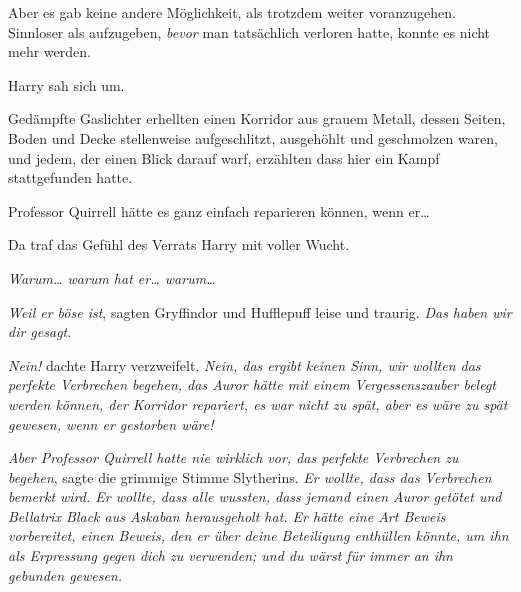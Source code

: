 Aber es gab keine andere Möglichkeit, als trotzdem weiter voranzugehen. Sinnloser als aufzugeben, \emph{bevor} man tatsächlich verloren hatte, konnte es nicht mehr werden.

Harry sah sich um.

Gedämpfte Gaslichter erhellten einen Korridor aus grauem Metall, dessen Seiten, Boden und Decke stellenweise aufgeschlitzt, ausgehöhlt und geschmolzen waren, und jedem, der einen Blick darauf warf, erzählten dass hier ein Kampf stattgefunden hatte.

Professor Quirrell hätte es ganz einfach reparieren können, wenn er…

Da traf das Gefühl des Verrats Harry mit voller Wucht.

\emph{Warum… warum hat er… warum…}

\emph{Weil er böse ist}, sagten Gryffindor und Hufflepuff leise und traurig. \emph{Das haben wir dir gesagt}.

\emph{Nein!} dachte Harry verzweifelt. \emph{Nein, das ergibt keinen Sinn, wir wollten das perfekte Verbrechen begehen, das Auror hätte mit einem Vergessenszauber belegt werden können, der Korridor repariert, es war nicht zu spät, aber es wäre zu spät gewesen, wenn er gestorben wäre!}

\emph{Aber Professor Quirrell hatte nie wirklich vor, das perfekte Verbrechen zu begehen}, sagte die grimmige Stimme Slytherins. \emph{Er wollte, dass das Verbrechen bemerkt wird. Er wollte, dass alle wussten, dass jemand einen Auror getötet und Bellatrix Black aus Askaban herausgeholt hat. Er hätte eine Art Beweis vorbereitet, einen Beweis, den er über deine Beteiligung enthüllen könnte, um ihn als Erpressung gegen dich zu verwenden; und du wärst für immer an ihn gebunden gewesen.}

